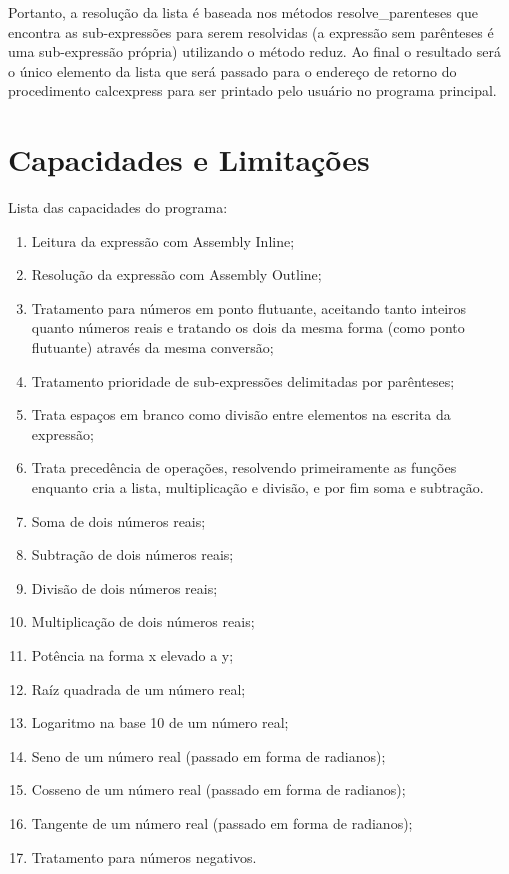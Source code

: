 \documentclass[12pt]{article}
\begin{document}
Portanto, a resolução da lista é baseada nos métodos resolve\_parenteses que encontra as sub-expressões para serem resolvidas (a expressão sem parênteses é uma sub-expressão própria) utilizando o método reduz. Ao final o resultado será o único elemento da lista que será passado para o endereço de retorno do procedimento calcexpress para ser printado pelo usuário no programa principal.

\section*{Capacidades e Limitações}

Lista das capacidades do programa:

\begin{enumerate}
\item Leitura da expressão com Assembly Inline;
\item Resolução da expressão com Assembly Outline;
\item Tratamento para números em ponto flutuante, aceitando tanto inteiros quanto números reais e tratando os dois da mesma forma (como ponto flutuante) através da mesma conversão;
\item Tratamento prioridade de sub-expressões delimitadas por parênteses;
\item Trata espaços em branco como divisão entre elementos na escrita da expressão;
\item Trata precedência de operações, resolvendo primeiramente as funções enquanto cria a lista, multiplicação e divisão, e por fim soma e subtração.
\item Soma de dois números reais;
\item Subtração de dois números reais;
\item Divisão de dois números reais;
\item Multiplicação de dois números reais;
\item Potência na forma x elevado a y;
\item Raíz quadrada de um número real;
\item Logaritmo na base 10 de um número real;
\item Seno de um número real (passado em forma de radianos);
\item Cosseno de um número real (passado em forma de radianos);
\item Tangente de um número real (passado em forma de radianos);
\item Tratamento para números negativos.
\end{enumerate}
\end{document}
